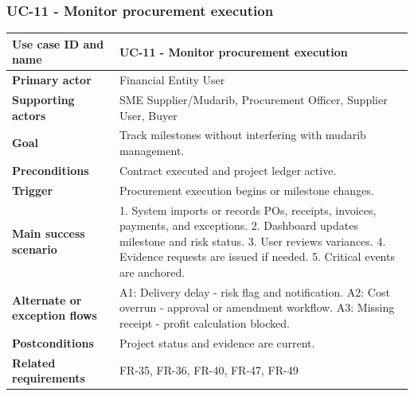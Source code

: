 \documentclass[11pt,a4paper]{article}
\begin{document}
\subsubsection{UC-11 - Monitor procurement execution}
\begin{footnotesize}
\begin{longtable}{@{}p{}p{}@{}}
\rowcolor{gray!10}\textbf{Use case ID and name} & UC-11 - Monitor procurement execution \\ \hline
\rowcolor{gray!10}\textbf{Primary actor} & Financial Entity User \\ \hline
\rowcolor{gray!10}\textbf{Supporting actors} & SME Supplier/Mudarib, Procurement Officer, Supplier User, Buyer \\ \hline
\rowcolor{gray!10}\textbf{Goal} & Track milestones without interfering with mudarib management. \\ \hline
\rowcolor{gray!10}\textbf{Preconditions} & Contract executed and project ledger active. \\ \hline
\rowcolor{gray!10}\textbf{Trigger} & Procurement execution begins or milestone changes. \\ \hline
\rowcolor{gray!10}\textbf{Main success scenario} & 1. System imports or records POs, receipts, invoices, payments, and exceptions. 2. Dashboard updates milestone and risk status. 3. User reviews variances. 4. Evidence requests are issued if needed. 5. Critical events are anchored. \\ \hline
\rowcolor{gray!10}\textbf{Alternate or exception flows} & A1: Delivery delay - risk flag and notification. A2: Cost overrun - approval or amendment workflow. A3: Missing receipt - profit calculation blocked. \\ \hline
\rowcolor{gray!10}\textbf{Postconditions} & Project status and evidence are current. \\ \hline
\rowcolor{gray!10}\textbf{Related requirements} & FR-35, FR-36, FR-40, FR-47, FR-49 \\ \hline
\end{longtable}
\end{footnotesize}
\end{document}
